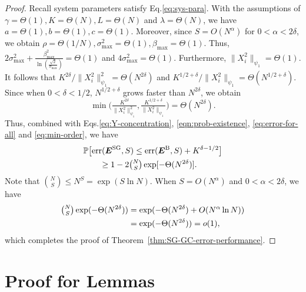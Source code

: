 \documentclass[lettersize,journal]{IEEEtran}
\newcommand{\err}[1]{\mathrm{err}(#1, S)}
\newcommand{\GSG}{\boldsymbol{E}^{\mathrm{SG}}}
\newcommand{\GB}{\boldsymbol{E}^{\mathrm{B}}}
\newcommand{\psione}[1]{\|#1\|_{\psi_1} }
\newcommand{\sigmamax}{\sigma_{\max}}
\newcommand{\betamax}{\beta_{\max}}
\begin{document}
{\begin{proof}
Recall system parameters satisfy Eq.\eqref{eq:sys-para}. With the assumptions of $\gamma = \Theta(1), K = \Theta(N), L = \Theta(N)$ and $\lambda = \Theta(N)$, we have
$ a = \Theta(1),
    b = \Theta(1),
    c = \Theta(1).$
Moreover, since $S = O(N^{\alpha})$ for $0<\alpha<2\delta$, we obtain
 $\rho = \Theta(1/N),
    \sigmamax^2 = \Theta(1),
    \betamax = \Theta(1).$
Thus, $2\sigmamax^2 + \frac{\betamax^2}{\ln{(\frac{\sqrt{2}}{\sigmamax})}} = \Theta(1)$
and $4\sigmamax^2 = \Theta(1).$
Furthermore, $\psione{X_i^2} = \Theta(1).$
 It follows that $K^{2\delta}/\psione{X_i^2}^2 =\Theta(N^{2\delta})$ and $K^{1/2+\delta}/\psione{X_i^2} =\Theta(N^{1/2+\delta})$. Since when $0<\delta<1/2$,  $N^{1/2+\delta}$ grows faster than $N^{2\delta}$, we obtain 
\begin{equation}
\min\Big(
            \tfrac{K^{2\delta}}{\psione{X_i^2}^2},
            \tfrac{K^{1/2+\delta}}{\psione{X_i^2}}
        \Big) = \Theta(N^{2\delta}).
\label{eq:min-order}
\end{equation}
Thus, combined with Eqs.\eqref{eq:Y-concentration}, \eqref{eqn:prob-existence}, \eqref{eq:error-for-all} and \eqref{eq:min-order}, we have
\begin{align*}
    &\mathbb{P}\big[\err{\GSG}\leq \err{\GB} + K^{\delta-1/2}\big]\\
    &\qquad\ge 1-2\tbinom{N}{S}\exp[
        -\Theta(N^{2\delta})
    ].
\end{align*}
Note that
$\binom{N}{S} \le N^S = \exp(S\ln N)$. When $S = O(N^\alpha)$ and $0 < \alpha < 2\delta$, we have
\begin{align*}
\tbinom{N}{S}\exp(-\Theta(N^{2\delta})) 
&= \exp(-\Theta(N^{2\delta})+O(N^{\alpha}\ln N))\\
&= \exp(-\Theta(N^{2\delta})) = o(1),
\end{align*}
which completes the proof of Theorem~\ref{thm:SG-GC-error-performance}.
\end{proof}


\section{Proof for Lemmas}

}
\end{document}
